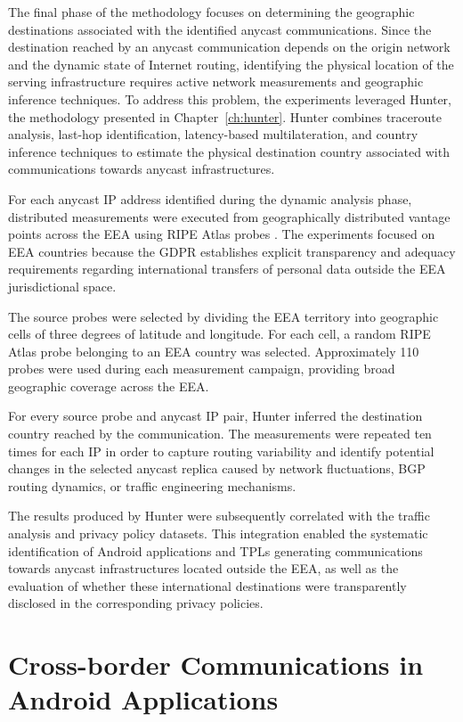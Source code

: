 The final phase of the methodology focuses on determining the geographic destinations associated with the identified anycast communications. Since the destination reached by an anycast communication depends on the origin network and the dynamic state of Internet routing, identifying the physical location of the serving infrastructure requires active network measurements and geographic inference techniques. To address this problem, the experiments leveraged Hunter, the methodology presented in Chapter~\ref{ch:hunter}. Hunter combines traceroute analysis, last-hop identification, latency-based multilateration, and country inference techniques to estimate the physical destination country associated with communications towards anycast infrastructures.

For each anycast IP address identified during the dynamic analysis phase, distributed measurements were executed from geographically distributed vantage points across the EEA using RIPE Atlas probes \cite{HomeAtlas}. The experiments focused on EEA countries because the GDPR establishes explicit transparency and adequacy requirements regarding international transfers of personal data outside the EEA jurisdictional space.

The source probes were selected by dividing the EEA territory into geographic cells of three degrees of latitude and longitude. For each cell, a random RIPE Atlas probe belonging to an EEA country was selected. Approximately 110 probes were used during each measurement campaign, providing broad geographic coverage across the EEA.

For every source probe and anycast IP pair, Hunter inferred the destination country reached by the communication. The measurements were repeated ten times for each IP in order to capture routing variability and identify potential changes in the selected anycast replica caused by network fluctuations, BGP routing dynamics, or traffic engineering mechanisms.

The results produced by Hunter were subsequently correlated with the traffic analysis and privacy policy datasets. This integration enabled the systematic identification of Android applications and TPLs generating communications towards anycast infrastructures located outside the EEA, as well as the evaluation of whether these international destinations were transparently disclosed in the corresponding privacy policies.

\section{Cross-border Communications in Android Applications}
\label{sc:anycast_experiments_cross_border}

